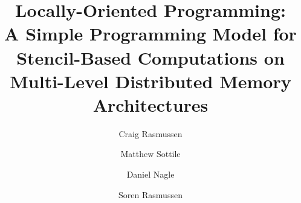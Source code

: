 \documentclass[runningheads,a4paper]{llncs}
\begin{document}
\mainmatter  %

\title{Locally-Oriented Programming:\\ A Simple Programming Model for Stencil-Based Computations
       on Multi-Level Distributed Memory Architectures}


\author{Craig Rasmussen
\and Matthew Sottile\and Daniel Nagle\and Soren Rasmussen}




%
%

\maketitle
\end{document}
